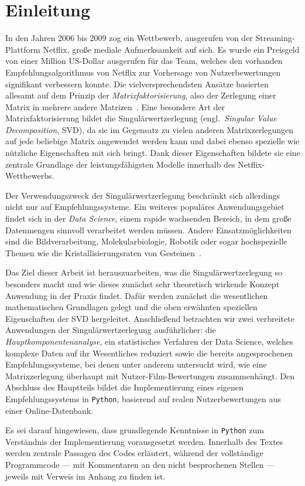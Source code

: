 \chapter{Einleitung}
In den Jahren \num{2006} bis \num{2009} zog ein Wettbewerb, ausgerufen von der Streaming-Plattform Netflix, große mediale Aufmerksamkeit auf sich.
Es wurde ein Preisgeld von einer Million US-Dollar ausgerufen für das Team, welches den vorhanden Empfehlungsalgorithmus von Netflix zur Vorhersage von Nutzerbewertungen signifikant verbessern konnte.
Die vielversprechendsten Ansätze basierten allesamt auf dem Prinzip der \emph{Matrixfaktorisierung}, also der Zerlegung einer Matrix in mehrere andere Matrizen~\cite{korenMatrixFactorizationTechniques2009}.
Eine besondere Art der Matrixfaktorisierung bildet die Singulärwertzerlegung (engl.\ \emph{Singular Value Decomposition}, SVD), da sie im Gegensatz zu vielen anderen Matrixzerlegungen auf jede beliebige Matrix angewendet werden kann und dabei ebenso spezielle wie nützliche Eigenschaften mit sich bringt.
Dank dieser Eigenschaften bildete sie eine zentrale Grundlage der leistungsfähigsten Modelle innerhalb des Netflix-Wettbewerbs.

Der Verwendungszweck der Singulärwertzerlegung beschränkt sich allerdings nicht nur auf Empfehlungssysteme.
Ein weiteres populäres Anwendungsgebiet findet sich in der \emph{Data Science}, einem rapide wachsenden Bereich, in dem große Datenmengen sinnvoll verarbeitet werden müssen.
Andere Einsatzmöglichkeiten sind die Bildverarbeitung, Molekularbiologie, Robotik oder sogar hochspezielle Themen wie die Kristallisierungsraten von Gesteinen~\cite{martinExtraordinarySVD2012}.

Das Ziel dieser Arbeit ist herauszuarbeiten, was die Singulärwertzerlegung so besonders macht und wie dieses zunächst sehr theoretisch wirkende Konzept Anwendung in der Praxis findet.
Dafür werden zunächst die wesentlichen mathematischen Grundlagen gelegt und die oben erwähnten speziellen Eigenschaften der SVD hergeleitet.
Anschließend betrachten wir zwei verbreitete Anwendungen der Singulärwertzerlegung ausführlicher:
die \emph{Hauptkomponentenanalyse}, ein statistisches Verfahren der Data Science, welches komplexe Daten auf ihr Wesentliches reduziert sowie die bereits angesprochenen Empfehlungssysteme, bei denen unter anderem untersucht wird, wie eine Matrixzerlegung überhaupt mit Nutzer-Film-Bewertungen zusammenhängt.
Den Abschluss des Hauptteils bildet die Implementierung eines eigenen Empfehlungssystems in \texttt{Python}, basierend auf realen Nutzerbewertungen aus einer Online-Datenbank.

Es sei darauf hingewiesen, dass grundlegende Kenntnisse in \texttt{Python} zum Verständnis der Implementierung vorausgesetzt werden.
Innerhalb des Textes werden zentrale Passagen des Codes erläutert, während der vollständige Programmcode --- mit Kommentaren an den nicht besprochenen Stellen --- jeweils mit Verweis im Anhang zu finden ist.
